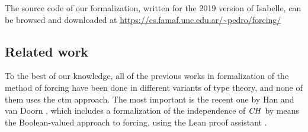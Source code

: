 The source code of our formalization, written for the 2019 version of
Isabelle, can be browsed and downloaded at
\url{https://cs.famaf.unc.edu.ar/~pedro/forcing/}


\subsection{Related work}
To the best of our knowledge, all of the previous works in
formalization of the method 
of forcing have been done in different variants of type theory, and
none of them uses the ctm approach. The
most important is the recent one by 
Han and van Doorn
\cite{han_et_al:LIPIcs:2019:11074,DBLP:conf/cpp/HanD20}, which includes
a formalization of the independence of $\mathit{CH}$ by means
the Boolean-valued approach to forcing, using the Lean
proof assistant \cite{DBLP:conf/cade/MouraKADR15}.

